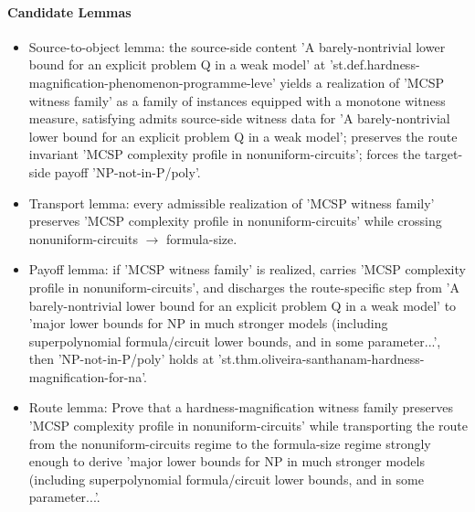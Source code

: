 \documentclass[11pt]{article}
\begin{document}
\paragraph{Candidate Lemmas}
\begin{itemize}[leftmargin=*,itemsep=0.2em]
\item Source-to-object lemma: the source-side content 'A barely-nontrivial lower bound for an explicit problem Q in a weak model' at 'st.def.hardness-magnification-phenomenon-programme-leve' yields a realization of 'MCSP witness family' as a family of instances equipped with a monotone witness measure, satisfying admits source-side witness data for 'A barely-nontrivial lower bound for an explicit problem Q in a weak model'; preserves the route invariant 'MCSP complexity profile in nonuniform-circuits'; forces the target-side payoff 'NP-not-in-P/poly'.
\item Transport lemma: every admissible realization of 'MCSP witness family' preserves 'MCSP complexity profile in nonuniform-circuits' while crossing nonuniform-circuits $\rightarrow$  formula-size.
\item Payoff lemma: if 'MCSP witness family' is realized, carries 'MCSP complexity profile in nonuniform-circuits', and discharges the route-specific step from 'A barely-nontrivial lower bound for an explicit problem Q in a weak model' to 'major lower bounds for NP in much stronger models (including superpolynomial formula/circuit lower bounds, and in some parameter...', then 'NP-not-in-P/poly' holds at 'st.thm.oliveira-santhanam-hardness-magnification-for-na'.
\item Route lemma: Prove that a hardness-magnification witness family preserves 'MCSP complexity profile in nonuniform-circuits' while transporting the route from the nonuniform-circuits regime to the formula-size regime strongly enough to derive 'major lower bounds for NP in much stronger models (including superpolynomial formula/circuit lower bounds, and in some parameter...'.
\end{itemize}
\end{document}
